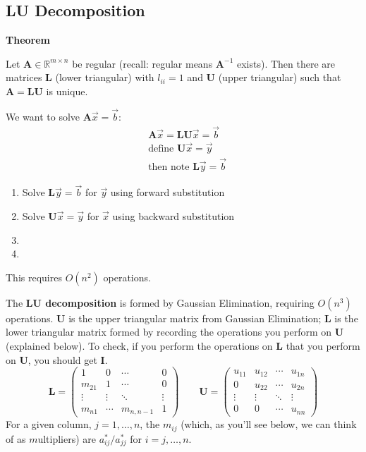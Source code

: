 \documentclass[12pt, answers]{exam}
\newcommand{\ve}[1]{\ensuremath{\mathbf{#1}}}
\begin{document}
\subsection*{LU Decomposition}

\textbf{Theorem}

Let $\ve{A} \in \mathbb{R}^{m \times n}$ be regular (recall: regular means $\ve{A}^{-1}$ exists). Then there are matrices $\ve{L}$ (lower triangular) with $l_{ii} = 1$ and $\ve{U}$ (upper triangular) such that $\ve{A} = \ve{L}\ve{U}$ is unique.

We want to solve $\ve{A}\vec{x} = \vec{b}$:
%
\begin{align}
&\ve{A}\vec{x} = \ve{L}\ve{U}\vec{x} = \vec{b} \nonumber \\
%
&\text{define } \ve{U}\vec{x} = \vec{y} \nonumber \\
%
&\text{then note }\ve{L}\vec{y} = \vec{b} \nonumber
\end{align}
%
\begin{enumerate}
\ifprintanswers
\item Solve $\ve{L}\vec{y} = \vec{b}$ for $\vec{y}$ using forward substitution
\item Solve $\ve{U}\vec{x} = \vec{y}$ for $\vec{x}$ using backward substitution
\else
\item
\item
\fi
\end{enumerate}
%
This requires $O(n^2)$ operations.

The \textbf{LU decomposition} is formed by Gaussian Elimination, requiring $O(n^3)$ operations. $\ve{U}$ is the upper triangular matrix from Gaussian Elimination; $\ve{L}$ is the lower triangular matrix formed by recording the operations you perform on $\ve{U}$ (explained below). To check, if you perform the operations on $\ve{L}$ that you perform on $\ve{U}$, you should get $\ve{I}$.
%
\begin{equation}
   \ve{L} = \begin{pmatrix}
      1      & 0      & \cdots    & 0 \\
      m_{21} & 1      & \cdots    & 0 \\
      \vdots & \vdots & \ddots    & \vdots \\     
      m_{n1} & \cdots & m_{n,n-1} & 1 
    \end{pmatrix} \qquad
  \ve{U} = \begin{pmatrix}
      u_{11} & u_{12} & \cdots & u_{1n} \\
      0      & u_{22} & \cdots & u_{2n} \\
      \vdots & \vdots & \ddots & \vdots \\     
      0      & 0      & \cdots &  u_{nn} 
    \end{pmatrix}
    \nonumber   
\end{equation} 
%
For a given column, $j = 1, \dots, n$, the $m_{ij}$ (which, as you'll see below, we can think of as $m$ultipliers) are $a^*_{ij} / a^*_{jj}$ for $i = j, \dots, n$. 
\end{document}
